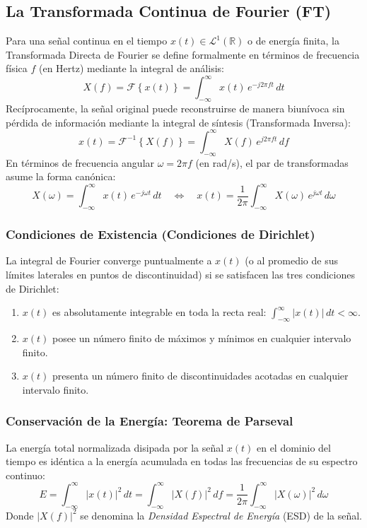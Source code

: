 \documentclass[11pt,a4paper]{article}
\begin{document}
\subsection{La Transformada Continua de Fourier (FT)}
Para una se\~nal continua en el tiempo $x(t) \in \mathcal{L}^1(\mathbb{R})$ o de energ\'ia finita, la Transformada Directa de Fourier se define formalmente en t\'erminos de frecuencia f\'isica $f$ (en Hertz) mediante la integral de an\'alisis:
\begin{equation}
  X(f) = \mathcal{F}\left\{ x(t) \right\} = \int_{-\infty}^{\infty} x(t) \, e^{-j 2\pi f t} \, dt
  \label{eq:ft_directa}
\end{equation}
Rec\'iprocamente, la se\~nal original puede reconstruirse de manera biun\'ivoca sin p\'erdida de informaci\'on mediante la integral de s\'intesis (Transformada Inversa):
\begin{equation}
  x(t) = \mathcal{F}^{-1}\left\{ X(f) \right\} = \int_{-\infty}^{\infty} X(f) \, e^{j 2\pi f t} \, df
  \label{eq:ft_inversa}
\end{equation}
En t\'erminos de frecuencia angular $\omega = 2\pi f$ (en rad/s), el par de transformadas asume la forma can\'onica:
\begin{equation}
  X(\omega) = \int_{-\infty}^{\infty} x(t) \, e^{-j \omega t} \, dt \quad \Longleftrightarrow \quad x(t) = \frac{1}{2\pi} \int_{-\infty}^{\infty} X(\omega) \, e^{j \omega t} \, d\omega
\end{equation}

\subsubsection{Condiciones de Existencia (Condiciones de Dirichlet)}
La integral de Fourier converge puntualmente a $x(t)$ (o al promedio de sus l\'imites laterales en puntos de discontinuidad) si se satisfacen las tres condiciones de Dirichlet:
\begin{enumerate}[label=\alph*)]
  \item $x(t)$ es absolutamente integrable en toda la recta real: $\int_{-\infty}^{\infty} |x(t)| \, dt < \infty$.
  \item $x(t)$ posee un n\'umero finito de m\'aximos y m\'inimos en cualquier intervalo finito.
  \item $x(t)$ presenta un n\'umero finito de discontinuidades acotadas en cualquier intervalo finito.
\end{enumerate}

\subsubsection{Conservaci\'on de la Energ\'ia: Teorema de Parseval}
La energ\'ia total normalizada disipada por la se\~nal $x(t)$ en el dominio del tiempo es id\'entica a la energ\'ia acumulada en todas las frecuencias de su espectro continuo:
\begin{equation}
  E = \int_{-\infty}^{\infty} |x(t)|^2 \, dt = \int_{-\infty}^{\infty} |X(f)|^2 \, df = \frac{1}{2\pi} \int_{-\infty}^{\infty} |X(\omega)|^2 \, d\omega
  \label{eq:parseval}
\end{equation}
Donde $|X(f)|^2$ se denomina la \textit{Densidad Espectral de Energ\'ia} (ESD) de la se\~nal.
\end{document}
